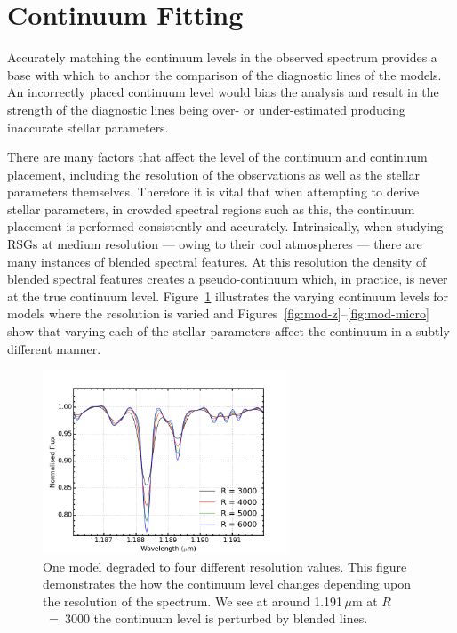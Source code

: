 \section{Continuum Fitting} %
\label{sec:continuum_fitting}

Accurately matching the continuum levels in the observed
spectrum provides a base with which to anchor the comparison of the diagnostic lines of the models.
An incorrectly placed continuum level would bias the analysis and result in the
strength of the diagnostic lines being over- or under-estimated producing inaccurate stellar parameters.

There are many factors that affect the level of the continuum and continuum placement,
including the resolution of the observations as well as the stellar parameters themselves.
Therefore it is vital that when attempting to derive stellar parameters,
in crowded spectral regions such as this, the continuum placement is performed
consistently and accurately.
Intrinsically, when studying RSGs at medium resolution --- owing  to their cool atmospheres ---
there are many instances of blended spectral features.
At this resolution the density of blended spectral features creates a pseudo-continuum which, in practice,
is never at the true continuum level.
Figure~\ref{fig:mod-res} illustrates the varying continuum levels for models where the resolution is varied and
Figures~\ref{fig:mod-z}--\ref{fig:mod-micro} show that varying each of the stellar parameters affect the continuum in a subtly different manner.

\begin{figure}
 \centering
\includegraphics[width=0.65\textwidth]{JAnal/Resolution}
\caption{
One model degraded to four different resolution values.
This figure demonstrates the how the continuum level changes depending upon
the resolution of the spectrum.
We see at around 1.191\,$\mu$m at $R$~=~3000 the continuum level is perturbed by blended lines.\label{fig:mod-res}
         }
\end{figure}

